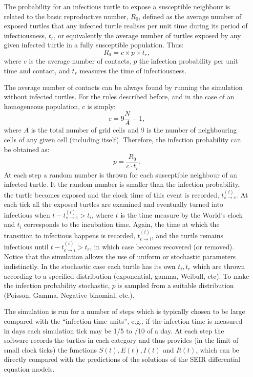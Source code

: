 \documentclass[a4paper,oneside,11pt]{article}
\begin{document}
The probability for an infectious turtle to expose a susceptible neighbour is related to the basic reproductive number, $R_0$,  defined as the average number of exposed turtles that any infected turtle realises per unit time during its period of infectiousness, $t_r$, or equivalently
the average number of turtles exposed by any given infected turtle in a fully susceptible population. Thus:
\begin{equation}
R_0 = c \times p \times t_r,
\label{eq:r0cptr}
\end{equation}
where $c$ is the average number of contacts, $p$ the infection probability per unit time and contact, and $t_r$ measures the time of infectiousness. 

The average number of contacts can be always found by running the simulation without infected turtles. For the rules described before, and in the case of an homogeneous population, c is simply:
\begin{equation}
c = 9 \frac{N}{A}-1,
\end{equation}
%
where $A$ is the total number of grid cells and 9 is the number of  neighbouring cells of any given cell (including itself). Therefore, the infection probability can be obtained as:
\begin{equation}
p = \frac{R_0}{c \cdot t_r}.
\end{equation}
At each step a random number is thrown for each susceptible neighbour of an infected turtle. It the random number is smaller than the infection probability, the turtle becomes exposed and the clock time of this event is recorded, $t_{s\rightarrow e}^{(i)}$. At each tick all the exposed turtles are examined and eventually turned into infectious when 
$t - t^{(i)}_{s\rightarrow e} > t_i$, where $t$ is the time measure by the World's clock and $t_i$ corresponds to the incubation time. Again, the time at which the transition to infectious happens is recorded, $t^{(i)}_{e\rightarrow i}$, and the turtle remains infectious until $t - t^{(i)}_{e\rightarrow i} > t_r$, in which case becomes recovered (or removed).
Notice that the simulation allows the use of uniform or stochastic parameters indistinctly. In the stochastic case each turtle has its own $t_i, t_r$ which are thrown according to a specified distribution (exponential, gamma, Weibull, etc). To make the infection probability stochastic, $p$ is sampled from a suitable distribution (Poisson, Gamma, Negative binomial, etc.).

The simulation is run for a number of steps which is typically chosen to be large compared with the ``infection time units'', e.g., if the infection time is measured in days each simulation tick may be 1/5 to /10 of a day. At each step the software records the turtles in each category and thus provides (in the limit of small clock ticks) the functions $S(t), E(t), I(t)$ and $R(t)$, which can be directly compared with the predictions of the solutions of the SEIR differential equation models.
\end{document}
